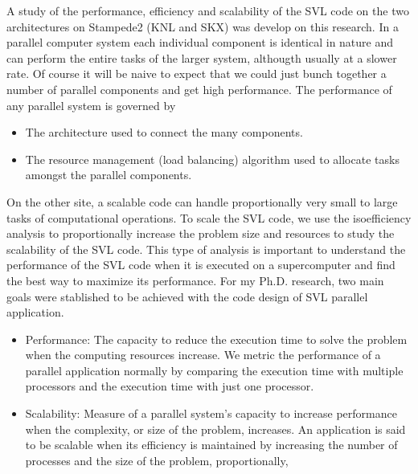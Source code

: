 \documentclass[a4paper, 11pt]{article}
\begin{document}
\begin{small}
A study of the performance, efficiency and scalability of the SVL code on the two architectures on Stampede2 (KNL and SKX) was develop on this research.
In a parallel computer system each individual component is identical in nature and can perform the entire tasks of the larger system, althougth usually at a slower rate.
Of course it will be naive to expect that we could just bunch together a number of parallel components and get high performance. The performance of any parallel system is governed by 
\begin{itemize}
\item The architecture used to connect the many components. 
\item The resource management (load balancing) algorithm used to allocate tasks amongst the parallel components. 
\end{itemize}
On the other site, a scalable code can handle proportionally very small to large tasks of computational operations.
To scale the SVL code, we use the isoefficiency analysis to proportionally increase the problem size and resources
to study the scalability of the SVL code. This type of analysis is important to understand the performance of the SVL code
when it is executed on a supercomputer and find the best way to maximize its performance.
For my Ph.D. research, two main goals were stablished to be achieved with the code design of SVL parallel application.
\begin{itemize}
\item Performance:  The capacity to reduce the execution time to solve the problem when the computing resources increase. We metric the performance of a parallel application normally by comparing the execution time with multiple processors and the execution time with just one processor. 
\item  Scalability:  Measure of a parallel system’s capacity to increase  performance when the complexity, or size of the problem, increases.
An application is said to be scalable when its efficiency is maintained by increasing the number of processes and the size of the problem, proportionally,

\end{itemize}
\end{small}
\end{document}
